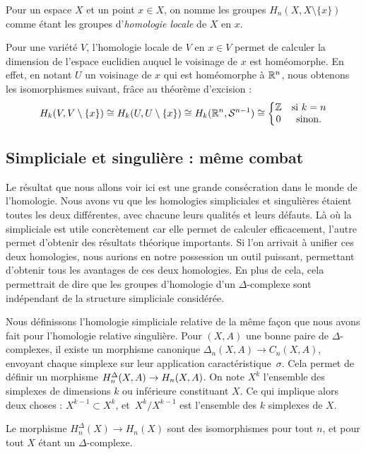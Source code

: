 Pour un espace $X$ et un point $x\in X$, on nomme les groupes $H_n(X,X\setminus\{x\})$ comme étant les groupes d'\emph{homologie locale} de $X$ en $x$.

\bigskip Pour une variété $V$, l'homologie locale de $V$ en $x\in V$ permet de calculer la dimension de l'espace euclidien auquel le voisinage de $x$ est homéomorphe. En effet, en notant $U$ un voisinage de $x$ qui est homéomorphe à $\mathbb{R}^n$, nous obtenons les isomorphismes suivant, frâce au théorème d'excision : \[H_k(V,V\setminus\{x\})\cong H_k(U,U\setminus\{x\})\cong H_k(\mathbb{R}^n,\mathcal{S}^{n-1})\cong\left\{\begin{matrix}
\mathbb{Z}&\text{si } k=n\\
0&\text{sinon}.
\end{matrix}\right.\]

\subsection{Simpliciale et singulière : même combat}

Le résultat que nous allons voir ici est une grande consécration dans le monde de l'homologie. Nous avons vu que les homologies simpliciales et singulières étaient toutes les deux différentes, avec chacune leurs qualités et leurs défauts. Là où la simpliciale est utile concrètement car elle permet de calculer efficacement, l'autre permet d'obtenir des résultats théorique importants. Si l'on arrivait à unifier ces deux homologies, nous aurions en notre possession un outil puissant, permettant d'obtenir tous les avantages de ces deux homologies. En plus de cela, cela permettrait de dire que les groupes d'homologie d'un $\Delta$-complexe sont indépendant de la structure simpliciale considérée.

\bigskip Nous définissons l'homologie simpliciale relative de la même façon que nous avons fait pour l'homologie relative singulière. Pour $(X,A)$ une bonne paire de $\Delta$-complexes, il existe un morphisme canonique $\Delta_n(X,A)\to C_n(X,A)$, envoyant chaque simplexe sur leur application caractéristique~$\sigma$. Cela permet de définir un morphisme $H^\Delta_n(X,A)\to H_n(X,A)$. On note $X^k$ l'ensemble des simplexes de dimensions $k$ ou inférieure constituant $X$. Ce qui implique alors deux choses : $X^{k-1}\subset X^k$, et~$X^k/X^{k-1}$ est l'ensemble des $k$ simplexes de $X$.

\begin{theorem}
Le morphisme $H_n^\Delta(X)\to H_n(X)$ sont des isomorphismes pour tout $n$, et pour tout $X$ étant un $\Delta$-complexe.
\end{theorem}

